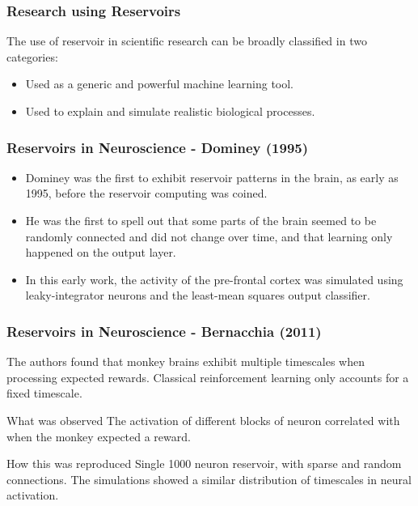\documentclass{beamer}
\begin{document}

\begin{frame}
\frametitle{Research using Reservoirs}

The use of reservoir in scientific research can be broadly classified in two categories:
\begin{itemize}
\item Used as a generic and powerful machine learning tool.
\item Used to explain and simulate realistic biological processes.
\end{itemize}

\end{frame}



\begin{frame}
\frametitle{Reservoirs in Neuroscience - Dominey (1995)}
\begin{itemize}
\item Dominey was the first to exhibit reservoir patterns in the brain, as early as 1995, before the reservoir computing was coined.
\item He was the first to spell out that some parts of the brain seemed to be randomly connected and did not change over time, and that learning only happened on the output layer. 
\item In this early work, the activity of the pre-frontal cortex was simulated using leaky-integrator neurons and the least-mean squares output classifier.
\end{itemize}
\end{frame}


\begin{frame}
\frametitle{Reservoirs in Neuroscience - Bernacchia (2011)}

The authors found that monkey brains exhibit multiple timescales when processing expected rewards. Classical reinforcement learning only accounts for a fixed timescale.
\begin{block}{What was observed}
The activation of different blocks of neuron correlated with when the monkey expected a reward.
\end{block} 

\begin{block}{How this was reproduced}
Single 1000 neuron reservoir, with sparse and random connections. The simulations showed a similar distribution of timescales in neural activation.
\end{block}

\end{frame}
\end{document}
